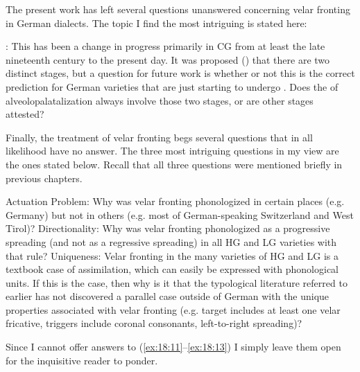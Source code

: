 \begin{sloppypar}
The present work has left several questions unanswered concerning velar fronting in German dialects. The topic I find the most intriguing is stated here:
\end{sloppypar}

\eanoraggedright %
    \label{ex:18:10}
           : This has been a change in progress primarily in CG from at least the late nineteenth century to the present day. It was proposed () that there are two distinct stages, but a question for future work is whether or not this is the correct prediction for German varieties that are just starting to undergo . Does the  of alveolopalatalization always involve those two stages, or are other stages attested?
\z 

Finally, the treatment of velar fronting begs several questions that in all likelihood have no answer. The three most intriguing questions in my view are the ones stated below. Recall that all three questions were mentioned briefly in previous chapters.

\eanoraggedright\sloppy %
\label{ex:18:11}Actuation Problem: Why was velar fronting phonologized in certain places (e.g. Germany) but not in others (e.g. most of German-speaking Switzerland and West Tirol)?
\ex%
\label{ex:18:12}Directionality: Why was velar fronting phonologized as a progressive spreading (and not as a regressive spreading) in all HG and LG varieties with that rule?
\ex%
\label{ex:18:13}Uniqueness: Velar fronting in the many varieties of HG and LG is a textbook case of assimilation, which can easily be expressed with phonological units. If this is the case, then why is it that the typological literature referred to earlier has not discovered a parallel case outside of German with the unique properties associated with velar fronting (e.g. target includes at least one velar fricative, triggers include coronal consonants, left-to-right spreading)?
\z 

Since I cannot offer answers to (\ref{ex:18:11}--\ref{ex:18:13}) I simply leave them open for the inquisitive reader to ponder.
